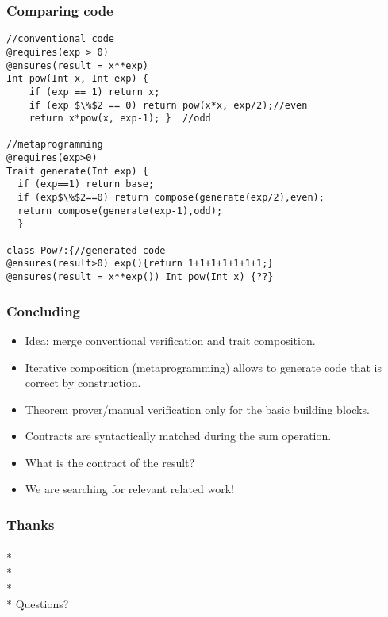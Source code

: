 \begin{frame}[fragile]
\frametitle{Comparing code}
\vspace{-3ex}
\begin{lstlisting}[basicstyle=\small]
//conventional code
@requires(exp > 0)
@ensures(result = x**exp)
Int pow(Int x, Int exp) {
	if (exp == 1) return x;
	if (exp $\%$2 == 0) return pow(x*x, exp/2);//even
	return x*pow(x, exp-1); }  //odd

//metaprogramming
@requires(exp>0)
Trait generate(Int exp) {
  if (exp==1) return base;
  if (exp$\%$2==0) return compose(generate(exp/2),even);
  return compose(generate(exp-1),odd);
  }

class Pow7:{//generated code
@ensures(result>0) exp(){return 1+1+1+1+1+1+1;}
@ensures(result = x**exp()) Int pow(Int x) {??}
\end{lstlisting}
\end{frame}

\begin{frame}[fragile]
\frametitle{Concluding}
\begin{itemize}
\item Idea: merge conventional verification and trait composition.
\item Iterative composition (metaprogramming) allows to generate
code that is correct by construction.
\item Theorem prover/manual verification  only for the basic building blocks.
\item Contracts are syntactically matched during the sum operation.
\item What is the contract of the result?
\item We are searching for relevant related work!
\end{itemize}
\end{frame}


\begin{frame}[fragile]
\frametitle{Thanks}
${}_{}$\\*
${}_{}$\\*
${}_{}$\\*
${}_{}$\\*
Questions?
\end{frame}



